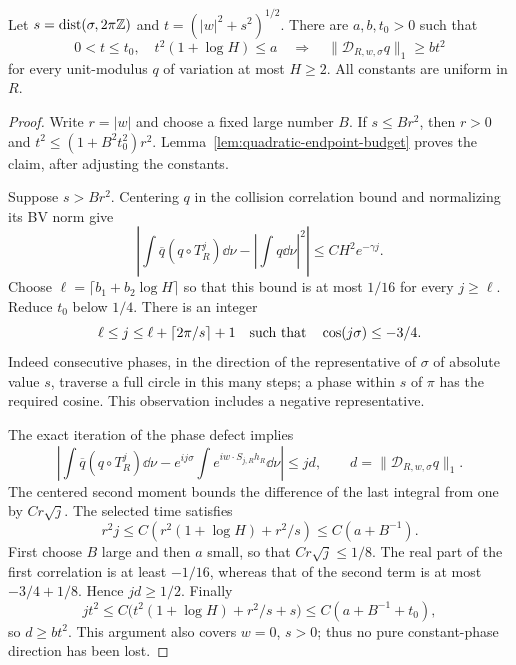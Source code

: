 \begin{lemma}
\label{lem:joint-collision-phase-defect}
Let $s=\operatorname{dist}(\sigma,2\pi\mathbb Z)$ and
$t=(|w|^2+s^2)^{1/2}$. There are $a,b,t_0>0$ such that
\begin{equation}\label{eq:joint-collision-circle}
 0<t\le t_0,\quad t^2(1+\log H)\le a
 \quad\Longrightarrow\quad
 \|\mathcal D_{R,w,\sigma}q\|_1\ge bt^2
\end{equation}
for every unit-modulus $q$ of variation at most $H\ge2$.
All constants are uniform in $R$.
\end{lemma}
\begin{proof}
Write $r=|w|$ and choose a fixed large number $B$.
If $s\le Br^2$, then $r>0$ and
$t^2\le(1+B^2t_0^2)r^2$. Lemma~\ref{lem:quadratic-endpoint-budget}
proves the claim, after adjusting the constants.

Suppose $s>Br^2$. Centering $q$ in the collision correlation bound
and normalizing its BV norm give
\[
 \left|\int\overline q(q\circ T_R^j)\dd\nu
                   -\left|\int q\dd\nu\right|^2\right|
       \le C H^2e^{-\gamma j}.
\]
Choose $\ell=\lceil b_1+b_2\log H\rceil$ so that this bound is at
most $1/16$ for every $j\ge\ell$. Reduce $t_0$ below $1/4$.
There is an integer
\[
 \ell\le j\le\ell+\lceil2\pi/s\rceil+1
       \quad\hbox{such that}\quad \cos(j\sigma)\le-3/4.
\]
Indeed consecutive phases, in the direction of the representative
of $\sigma$ of absolute value $s$, traverse a full circle in this
many steps; a phase within $s$ of $\pi$ has the required cosine.
This observation includes a negative representative.

The exact iteration of the phase defect implies
\[
 \left|\int\overline q(q\circ T_R^j)\dd\nu
       -e^{ij\sigma}\int e^{iw\cdot S_{j,R}h_R}\dd\nu\right|
       \le j d,\qquad d=\|\mathcal D_{R,w,\sigma}q\|_1.
\]
The centered second moment bounds the difference of the last integral
from one by $C r\sqrt j$. The selected time satisfies
\[
 r^2j\le C(r^2(1+\log H)+r^2/s)\le C(a+B^{-1}).
\]
First choose $B$ large and then $a$ small, so that
$C r\sqrt j\le1/8$. The real part of the first correlation is at
least $-1/16$, whereas that of the second term is at most
$-3/4+1/8$. Hence $jd\ge1/2$.
Finally
\[
 jt^2\le C\bigl(t^2(1+\log H)+r^2/s+s\bigr)
                  \le C(a+B^{-1}+t_0),
\]
so $d\ge bt^2$. This argument also covers $w=0$, $s>0$; thus no
pure constant-phase direction has been lost.
\end{proof}

